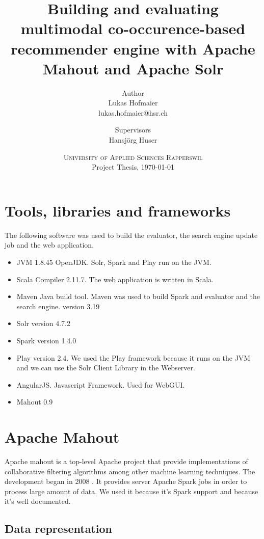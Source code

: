 \documentclass[twoside,a4paper]{article}
\title{ Building and evaluating multimodal co-occurence-based recommender engine with Apache Mahout and Apache Solr }
\author{
	Author \\
	Lukas Hofmaier \\
	lukas.hofmaier@hsr.ch
 	\and
	Supervisors \\
        Hansj\"org Huser
}
\date{
	\textsc{University of Applied Sciences Rapperswil}\\
	Project Thesis,
	\today
}
\begin{document}
\maketitle
\tableofcontents








\appendix

\section{Tools, libraries and frameworks}

The following software was used to build the evaluator, the search engine update job and the web application.
\begin{itemize}
\item JVM 1.8.45 OpenJDK. Solr, Spark and Play run on the JVM.
\item Scala Compiler 2.11.7. The web application is written in Scala.
\item Maven Java build tool. Maven was used to build Spark and evaluator and the search engine. version 3.19
\item Solr version 4.7.2
\item Spark version 1.4.0
\item Play version 2.4. We used the Play framework because it runs on the JVM and we can use the Solr Client Library in the Webserver.
\item AngularJS. Javascript Framework. Used for WebGUI.
\item Mahout 0.9 
\end{itemize}

\section{Apache Mahout}
\label{sec:mahout}

Apache mahout is a top-level Apache project that provide implementations of collaborative filtering algorithms among other machine learning techniques. The development began in 2008 \cite{Owen}. It provides server Apache Spark jobs in order to process large amount of data. We used it because it's Spark support and because it's well documented.

\subsection{Data representation}
\label{sec:datarepresentation}
\end{document}
